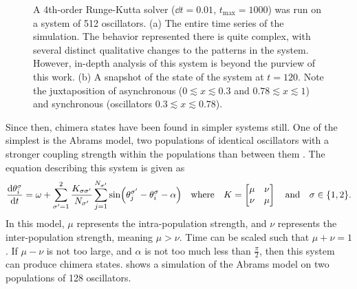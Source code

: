 \begin{figure}[ht]
{    A 4th-order Runge-Kutta solver ($\dd{t} = 0.01$, $t_{\text{max}} = 1000$) was run on a system of 512 oscillators.
    (a) The entire time series of the simulation.
    The behavior represented there is quite complex, with several distinct qualitative changes to the patterns in the system.
    However, in-depth analysis of this system is beyond the purview of this work.
    (b) A snapshot of the state of the system at $t = 120$.
    Note the juxtaposition of asynchronous ($0 \lesssim x \lesssim 0.3$ and $0.78 \lesssim x \lesssim 1$) and synchronous (oscillators $0.3 \lesssim x \lesssim 0.78$).
  }
  \label{fig:kuramoto_chimera}
\end{figure}

Since then, chimera states have been found in simpler systems still.
One of the simplest is the Abrams model, two populations of identical oscillators with a stronger coupling strength within the populations than between them \cite{Abrams2008}.
The equation describing this system is given as
\begin{equation}
  \label{eq:abrams}
  \dv{\theta_{i}^{\sigma}}{t}
  =
  \omega
  +
  \sum_{\sigma' = 1}^{2} \frac{K_{\sigma \sigma'}}{N_{\sigma'}} \sum_{j = 1}^{N_{\sigma'}} \sin(\theta_{j}^{\sigma'} - \theta_{i}^{\sigma} - \alpha)
  \qq{where}
  K
  =
  \bmqty{\mu & \nu \\ \nu & \mu}
  \qand
  \sigma \in \Bqty{1, 2}.
\end{equation}
In this model, $\mu$ represents the intra-population strength, and $\nu$ represents the inter-population strength, meaning $\mu > \nu$.
Time can be scaled such that $\mu + \nu = 1$.
If $\mu - \nu$ is not too large, and $\alpha$ is not too much less than $\frac{\pi}{2}$, then this system can produce chimera states.
 shows a simulation of the Abrams model on two populations of 128 oscillators.
